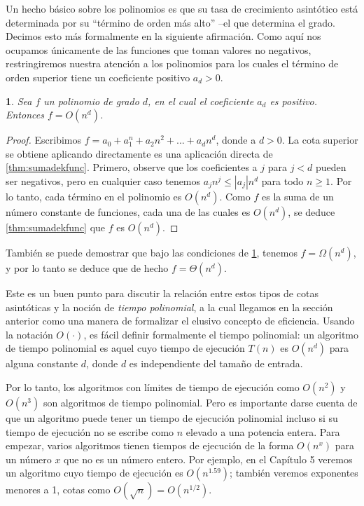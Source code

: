 \documentclass[a4paper, 12pt]{book}
\newtheorem{theorem}{}%
\begin{document}
Un hecho básico sobre los polinomios es que su tasa de crecimiento asintótico está determinada por su ``término de orden más alto'' --el que determina el grado. Decimos esto más formalmente en la siguiente afirmación. Como aquí nos ocupamos únicamente de las funciones que toman valores no negativos, restringiremos nuestra atención a los polinomios para los cuales el término de orden superior tiene un coeficiente positivo $a_d>0$.

\begin{theorem}
\label{thm:ordendepoli}
Sea $f$ un polinomio de grado $d$, en el cual el coeficiente $a_d$ es positivo. Entonces $f = O(n^d)$.
\end{theorem}

\begin{proof}
Escribimos $f = a_0 + a_1^n + a_2n^2 + ... + a_dn^d$, donde a $d>0$. La cota superior se obtiene aplicando directamente es una aplicación directa de \ref{thm:sumadekfunc}. Primero, observe que los coeficientes a $j$ para $j<d$ pueden ser negativos, pero en cualquier caso tenemos $a_jn^j ≤ |a_j|n^d$ para todo $n≥1$. Por lo tanto, cada término en el polinomio es $O(n^d)$. Como $f$ es la suma de un número constante de funciones, cada una de las cuales es $O(n^d)$, se deduce \ref{thm:sumadekfunc} que $f$ es $O(n^d)$. 
\end{proof}

También se puede demostrar que bajo las condiciones de \ref{thm:ordendepoli}, tenemos $f=\Omega(n^d)$, y por lo tanto se deduce que de hecho $f = \Theta(n^d)$.

Este es un buen punto para discutir la relación entre estos tipos de cotas asintóticas y la noción de \textit{tiempo polinomial}, a la cual llegamos en la sección anterior como una manera de formalizar el elusivo concepto de eficiencia. Usando la notación $O(\cdot)$, es fácil definir formalmente el tiempo polinomial: un algoritmo de tiempo polinomial es aquel cuyo tiempo de ejecución $T(n)$ es $O(n^d)$ para alguna constante $d$, donde $d$ es independiente del tamaño de entrada.

Por lo tanto, los algoritmos con límites de tiempo de ejecución como $O(n^2)$ y $O(n^3)$ son algoritmos de tiempo polinomial. Pero es importante darse cuenta de que un algoritmo puede tener un tiempo de ejecución polinomial incluso si su tiempo de ejecución no se escribe como $n$ elevado a una potencia entera. Para empezar, varios algoritmos tienen tiempos de ejecución de la forma $O(n^x)$ para un número $x$ que no es un número entero. Por ejemplo, en el Capítulo 5 veremos un algoritmo cuyo tiempo de ejecución es $O(n^{1.59})$; también veremos exponentes menores a 1, cotas como $O(\sqrt{n}) = O(n^{1/2})$.
\end{document}
